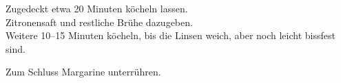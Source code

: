\begin{recipe}
{    \step%
    Zugedeckt etwa 20 Minuten köcheln lassen.\\
     
    \step%
    Zitronensaft und restliche Brühe dazugeben.\\
        
    \step%
    Weitere 10--15 Minuten köcheln, bis die Linsen weich, aber noch leicht bissfest sind.
         
    \step%
    Zum Schluss Margarine unterrühren.
}


    
\end{recipe}